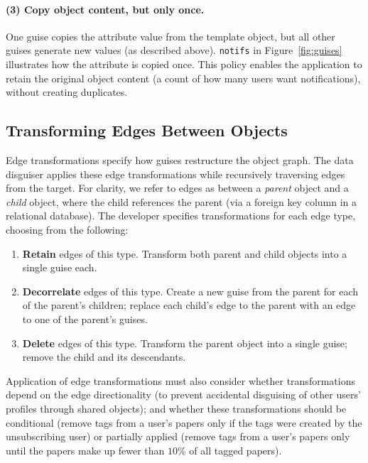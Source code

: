 \paragraph{(3) Copy object content, but only once.} One guise copies the attribute value from the
template object, but all other guises generate new values (as described above).  \texttt{notifs} in
Figure~\ref{fig:guises} illustrates how the attribute is copied once. This policy enables the
application to retain the original object content (\eg a count of how many users want
notifications), without \eg creating duplicates.

\subsection{Transforming Edges Between Objects}
\label{design:edgepol}

Edge transformations specify how guises restructure the object graph. 
The data disguiser applies these edge transformations while
recursively traversing edges from the target.  For clarity, we refer to edges as between a
\emph{parent} object and a \emph{child} object, where the child references the parent 
(\eg via a foreign key column in a relational database).
%
The developer specifies transformations for each edge type, choosing from the following:
\begin{enumerate}[nosep]
    \item \textbf{Retain} edges of this type. Transform both parent and child objects into a single guise
        each. 
    \item \textbf{Decorrelate} edges of this type. Create a new guise from the parent for each of
        the parent's children; replace each child's edge to the parent with an edge to one of the
        parent's guises.
    \item \textbf{Delete} edges of this type. Transform the parent object into a single guise; 
        remove the child and its descendants.
\end{enumerate}

Application of edge transformations must also consider whether transformations depend on the edge
directionality (to \eg prevent accidental disguising of other users' profiles through shared objects);
and whether these transformations should be conditional (\eg remove tags from a user's papers only
if the tags were created by the unsubscribing user) or partially applied (\eg remove tags from a
user's papers only until the papers make up fewer than $10$\% of all tagged papers).

